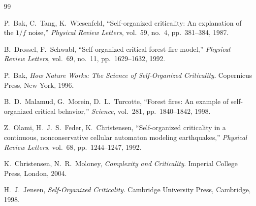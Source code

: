 \documentclass[12pt,a4paper]{article}
\begin{document}

\begin{thebibliography}{99}

P.\ Bak, C.\ Tang, K.\ Wiesenfeld,
``Self-organized criticality: An explanation of the $1/f$ noise,''
\textit{Physical Review Letters}, vol.~59, no.~4, pp.~381--384, 1987.

B.\ Drossel, F.\ Schwabl,
``Self-organized critical forest-fire model,''
\textit{Physical Review Letters}, vol.~69, no.~11, pp.~1629--1632, 1992.

P.\ Bak,
\textit{How Nature Works: The Science of Self-Organized Criticality}.
Copernicus Press, New York, 1996.

B.\ D.\ Malamud, G.\ Morein, D.\ L.\ Turcotte,
``Forest fires: An example of self-organized critical behavior,''
\textit{Science}, vol.~281, pp.~1840--1842, 1998.

Z.\ Olami, H.\ J.\ S.\ Feder, K.\ Christensen,
``Self-organized criticality in a continuous, nonconservative cellular
automaton modeling earthquakes,''
\textit{Physical Review Letters}, vol.~68, pp.~1244--1247, 1992.

K.\ Christensen, N.\ R.\ Moloney,
\textit{Complexity and Criticality}.
Imperial College Press, London, 2004.

H.\ J.\ Jensen,
\textit{Self-Organized Criticality}.
Cambridge University Press, Cambridge, 1998.

\end{thebibliography}
\end{document}
